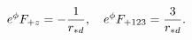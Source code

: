 \begin{equation}
e^{\phi}F_{+z}
=-{1\over r_{*d}},\quad
e^{\phi}F_{+123}
= {3\over r_{*d}}.
\label{eq:fluxes}
\end{equation}

